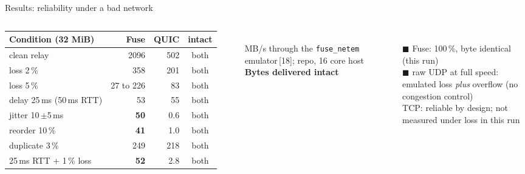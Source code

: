 \documentclass[aspectratio=169,11pt]{beamer}
\newcommand{\rf}[1]{{\scriptsize\,[#1]}}
\begin{document}
\begin{frame}{Results: reliability under a bad network}
  \begin{columns}[T]
    \scriptsize
    \begin{tabular}{@{}lrrc@{}}
      \toprule
      \textbf{Condition} (32 MiB) & \textbf{Fuse} & \textbf{QUIC} & \textbf{intact} \\
      \midrule
      clean relay & 2096 & 502 & both \\
      loss 2\,\% & 358 & 201 & both \\
      loss 5\,\% & 27 to 226 & 83 & both \\
      delay 25\,ms (50\,ms RTT) & 53 & 55 & both \\
      jitter 10\,$\pm$5\,ms & \textbf{50} & 0.6 & both \\
      reorder 10\,\% & \textbf{41} & 1.0 & both \\
      duplicate 3\,\% & 249 & 218 & both \\
      25\,ms RTT + 1\,\% loss & \textbf{52} & 2.8 & both \\
      \bottomrule
    \end{tabular}\\[1mm]
    MB/s through the \texttt{fuse\_netem} emulator\rf{18}; repo, 16 core host
    \centering\small\textbf{Bytes delivered intact}\\[1mm]
    \\
    \scriptsize\textcolor{fblue}{$\blacksquare$} Fuse: 100\,\%, byte identical (this run)\\
    \textcolor{fred!60}{$\blacksquare$} raw UDP at full speed: emulated loss \emph{plus} overflow (no congestion control)\\
    TCP: reliable by design; not measured under loss in this run
  \end{columns}
\end{frame}
\end{document}
